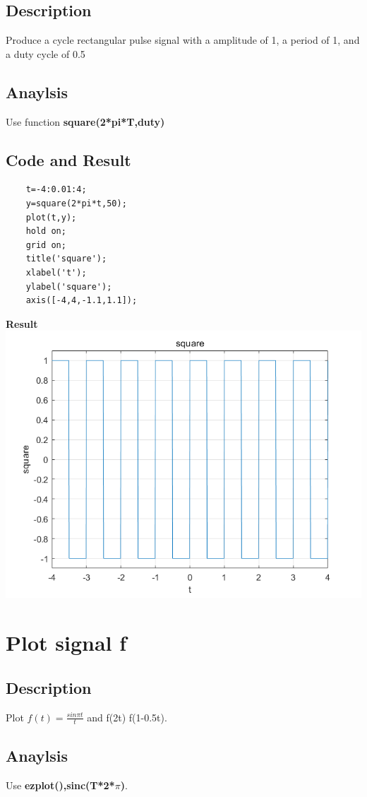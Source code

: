 \documentclass[UTF8,a4paper]{article}
\begin{document}
\subsection{Description}
Produce a cycle rectangular pulse signal with a amplitude of 1, a period of 1, and a duty cycle of 0.5
\subsection{Anaylsis}
\noindent Use function \textbf{square(2*pi*T,duty)}
\subsection{Code and Result}
\begin{lstlisting}
    t=-4:0.01:4;
    y=square(2*pi*t,50);
    plot(t,y);
    hold on;
    grid on;
    title('square');
    xlabel('t');
    ylabel('square');
    axis([-4,4,-1.1,1.1]);
\end{lstlisting}
\textbf{Result}\\
\includegraphics[scale=0.6]{3.png}\\

\section{Plot signal f}
\subsection{Description}
Plot $f(t)=\frac{sin \pi t}{t}$ and f(2t) f(1-0.5t).
\subsection{Anaylsis}
\noindent Use \textbf{ezplot(),sinc(T*2*$\pi$)}. 
\end{document}

